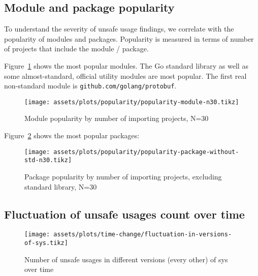 
\subsection{Module and package popularity}\label{subsec:results-popularity}

To understand the severity of unsafe usage findings, we correlate with the popularity of modules and packages.
Popularity is measured in terms of number of projects that include the module / package.

Figure~\ref{fig:popularity-module} shows the most popular modules.
The Go standard library as well as some almost-standard, official utility modules are most popular.
The first real non-standard module is \texttt{github.com/golang/protobuf}.

\begin{figure}[ht]
    \centering
    {\scriptsize \texttt{[image: assets/plots/popularity/popularity-module-n30.tikz]}}
    \caption{Module popularity by number of importing projects, N=30}
    \label{fig:popularity-module}
\end{figure}

Figure~\ref{fig:popularity-package} shows the most popular packages:

\begin{figure}[ht]
    \centering
    {\scriptsize \texttt{[image: assets/plots/popularity/popularity-package-without-std-n30.tikz]}}
    \caption{Package popularity by number of importing projects, excluding standard library, N=30}
    \label{fig:popularity-package}
\end{figure}



\subsection{Fluctuation of unsafe usages count over time}\label{subsec:results-time-change}

\begin{figure}[ht]
    \centering
    {\scriptsize \texttt{[image: assets/plots/time-change/fluctuation-in-versions-of-sys.tikz]}}
    \caption{Number of unsafe usages in different versions (every other) of sys over time}
    \label{fig:fluctuation-in-versions-of-sys}
\end{figure}

